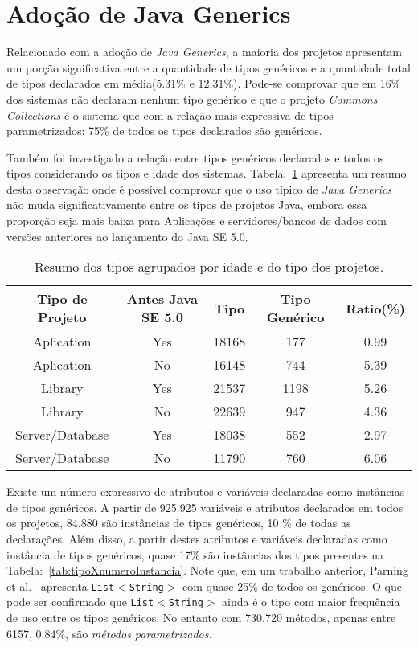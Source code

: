 
\section{Adoção de Java Generics}
Relacionado com a adoção de \textit{Java Generics}, a maioria dos projetos apresentam um porção significativa entre a quantidade de tipos genéricos e a quantidade total de tipos declarados em média(5.31\% e 12.31\%). Pode-se comprovar que em 16\% dos sistemas não declaram nenhum tipo genérico e que o projeto \textit{Commons Collections} é o sistema que com a relação mais expressiva de tipos parametrizados: 75\% de todos os tipos declarados são genéricos.

Também foi investigado a relação entre tipos genéricos declarados e todos os tipos considerando os tipos e idade dos sistemas. Tabela:~\ref{tab:std} apresenta um resumo desta observação onde é possível comprovar que o uso típico de  \textit{Java Generics} não muda significativamente entre os tipos de projetos Java, embora essa proporção seja mais baixa para Aplicações e servidores/bancos de dados com versões anteriores ao lançamento do Java SE 5.0.

\begin{table}[h!]
	\centering
	\caption{Resumo dos tipos agrupados por idade e do tipo dos projetos.}
	\begin{tabular}{ccccc} \hline 
		Tipo de Projeto & Antes Java SE 5.0 & Tipo & Tipo Genérico & Ratio(\%) \\ \hline\hline
		Aplication & Yes & 18168 & 177 & 0.99 \\
		Aplication & No & 16148 & 744 & 5.39 \\
		Library & Yes & 21537 & 1198 & 5.26 \\
		Library & No & 22639 & 947 & 4.36 \\
		Server/Database & Yes & 18038 & 552 & 2.97 \\ 
		Server/Database & No & 11790 & 760 & 6.06 \\ \hline
	\end{tabular}
	\label{tab:std} %
\end{table}


Existe um número expressivo de atributos e variáveis declaradas como instâncias de tipos genéricos. A partir de 925.925 variáveis e atributos declarados em todos os projetos, 84.880 são instâncias de tipos genéricos, 10 \% de todas as declarações. Além disso, a partir destes atributos e variáveis declaradas como instância de tipos genéricos, quase 17\% são instâncias dos tipos presentes na Tabela:~\ref{tab:tipoXnumeroInstancia}. Note que, em um trabalho anterior, Parning et al.~\cite{Parnin:ACM2011} apresenta \texttt{List$<$String$>$} com quase 25\% de todos os genéricos. O que pode ser confirmado que \texttt{List$<$String$>$} ainda é o tipo com maior frequência de uso entre os tipos genéricos. No entanto com 730.720 métodos, apenas entre 6157, 0.84\%, são \emph{métodos parametrizados.}

